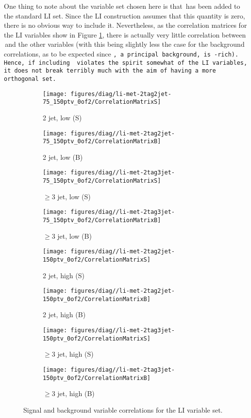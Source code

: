 One thing to note about the variable set chosen here is that \met\,has been added to the standard LI set.  Since the LI construction assumes that this quantity is zero, there is no obvious way to include it.  Nevertheless, as the correlation matrices for the LI variables show in Figure \ref{fig:li-met-Correlations}, there is actually very little correlation between \met\,and the other variables (with this being slightly less the case for the background correlations, as to be expected since \tt, a principal background, is \met-rich).  Hence, if including \met\,violates the spirit somewhat of the LI variables, it does not break terribly much with the aim of having a more orthogonal set.
\begin{figure}[!htbp]\captionsetup{justification=centering}
  \centering
\begin{subfigure}[t]{0.220000\textwidth}\centering\texttt{[image: figures/diag/li-met-2tag2jet-75\_150ptv\_0of2/CorrelationMatrixS]}\caption{2 jet, low \ptv (S)}\end{subfigure}
\begin{subfigure}[t]{0.220000\textwidth}\centering\texttt{[image: figures/diag//li-met-2tag2jet-75\_150ptv\_0of2/CorrelationMatrixB]}\caption{2 jet, low \ptv (B)}\end{subfigure}
\begin{subfigure}[t]{0.220000\textwidth}\centering\texttt{[image: figures/diag//li-met-2tag3jet-75\_150ptv\_0of2/CorrelationMatrixS]}\caption{$\ge3$ jet, low \ptv (S)}\end{subfigure}
\begin{subfigure}[t]{0.220000\textwidth}\centering\texttt{[image: figures/diag//li-met-2tag3jet-75\_150ptv\_0of2/CorrelationMatrixB]}\caption{$\ge3$ jet, low \ptv (B)}\end{subfigure}
\begin{subfigure}[t]{0.220000\textwidth}\centering\texttt{[image: figures/diag//li-met-2tag2jet-150ptv\_0of2/CorrelationMatrixS]}\caption{2 jet, high \ptv (S)}\end{subfigure}
\begin{subfigure}[t]{0.220000\textwidth}\centering\texttt{[image: figures/diag//li-met-2tag2jet-150ptv\_0of2/CorrelationMatrixB]}\caption{2 jet, high \ptv (B)}\end{subfigure}
\begin{subfigure}[t]{0.220000\textwidth}\centering\texttt{[image: figures/diag//li-met-2tag3jet-150ptv\_0of2/CorrelationMatrixS]}\caption{$\ge3$ jet, high \ptv (S)}\end{subfigure}
\begin{subfigure}[t]{0.220000\textwidth}\centering\texttt{[image: figures/diag//li-met-2tag3jet-150ptv\_0of2/CorrelationMatrixB]}\caption{$\ge3$ jet, high \ptv (B)}\end{subfigure}
  \caption{Signal and background variable correlations for the LI variable set.}
  \label{fig:li-met-Correlations}
\end{figure}
\clearpage
